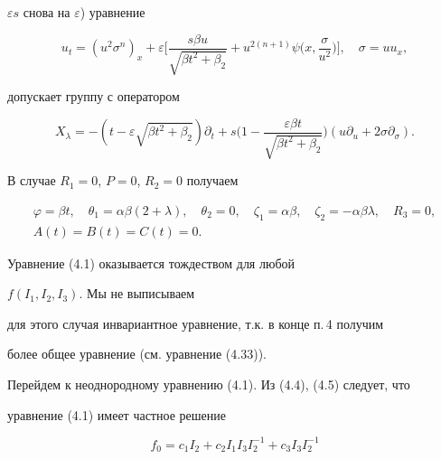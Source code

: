 $\varepsilon s$ снова на $\varepsilon$) уравнение


\begin{equation}


u_t=(u^2\sigma^n)_x+\varepsilon\biggl[


\frac{s\beta u}{\sqrt{\beta t^2+\beta_2}}+u^{2(n+1)}


\psi\biggl(x,\frac{\sigma}{u^2}\biggr)\biggr],\quad


\sigma=uu_x,\tag{4.21}


\end{equation}


допускает группу с оператором


\begin{equation}


X_\lambda=-(t-\varepsilon\sqrt{\beta t^2+\beta_2})\partial_t+


s\biggl(1-\frac{\varepsilon\beta t}{\sqrt{\beta t^2+\beta_2}}


\biggr)(u\partial_u+2\sigma\partial_\sigma).\tag{4.22}


\end{equation}


В случае $R_1=0$, $P=0$, $R_2=0$ получаем


\begin{gather*}


\varphi=\beta t,\quad \theta_1=\alpha\beta(2+\lambda),\quad


\theta_2=0,\quad \zeta_1=\alpha\beta,\quad


\zeta_2=-\alpha\beta\lambda,\quad R_3=0,\\


A(t)=B(t)=C(t)=0.


\end{gather*}


Уравнение (4.1) оказывается тождеством для любой


$f(I_1,I_2,I_3)$. Мы не выписываем


для этого случая инвариантное уравнение, т.к. в конце п.\,4 получим


более общее уравнение (см. уравнение (4.33)).





Перейдем к неоднородному уравнению (4.1). Из (4.4), (4.5) следует, что


уравнение (4.1) имеет частное решение


\begin{equation}


f_0=c_1I_2+c_2I_1I_3I_2^{-1}+c_3I_3I_2^{-1} \tag{4.23}


\end{equation}


